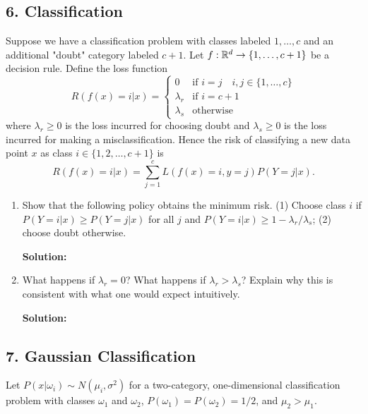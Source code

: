 \documentclass{article}
\newcommand{\solution}{\textbf{Solution: }}
\begin{document}
\subsection*{6. Classification}
Suppose we have a classification problem with classes labeled $1, \ldots, c$ and an additional "doubt" category labeled $c+1$. Let $f: \mathbb{R}^d \rightarrow \{1, \ldots, c+1\}$ be a decision rule. Define the loss function
$$ R(f(x) = i|x) =
\begin{cases}
0 & \text{if }i = j \quad i, j \in \{1, \ldots, c\} \\
\lambda_r & \text{if } i=c + 1 \\
\lambda_s & \text{otherwise}
\end{cases} $$
where $\lambda_r \geq 0$ is the loss incurred for choosing doubt and $\lambda_s \geq 0$ is the loss incurred for making a misclassification. Hence the risk of classifying a new data point $x$ as class $i \in \{1, 2, \ldots, c+1\}$ is $$R(f(x) = i|x) = \sum_{j=1}^c L(f(x) = i, y = j) P(Y = j|x).$$
\begin{enumerate}[label=(\alph*)]
    \item Show that the following policy obtains the minimum risk. (1) Choose class $i$ if $P(Y = i|x) \geq P(Y = j|x)$ for all $j$ and $P(Y=i|x) \geq 1 - \lambda_r / \lambda_s$; (2) choose doubt otherwise.
    \begin{mdframed}
    \solution %
    \end{mdframed}

    \item What happens if $\lambda_r = 0$? What happens if $\lambda_r > \lambda_s$?  Explain why this is consistent with what one would expect intuitively.
    \begin{mdframed}
    \solution %
    \end{mdframed}
\end{enumerate}

\newpage
\subsection*{7. Gaussian Classification}
Let $P(x | \omega_i) \sim N(\mu_i, \sigma^2)$ for a two-category,
one-dimensional classification problem with classes $\omega_1$ and $\omega_2$,
$P(\omega_1) = P(\omega_2) = 1/2$, and $\mu_2 > \mu_1$.
\end{document}
